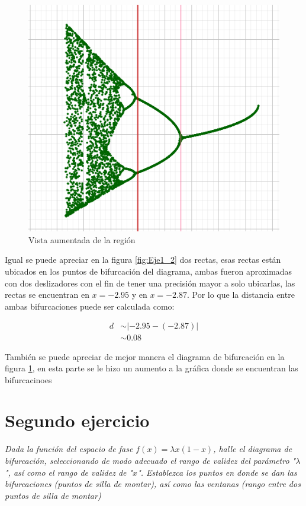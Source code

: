 \documentclass[11pt]{report}
\theoremstyle{plain}
\theoremstyle{definition}
\begin{document}
\begin{figure}[!h] %
	\centering
	\includegraphics[scale=0.3]{caos_1_3.png}
	\caption{Vista aumentada de la región}
	\label{fig:Eje1_3}
\end{figure}

Igual se puede apreciar en la figura \ref{fig:Eje1_2} dos rectas, esas rectas están ubicados en los puntos de bifurcación del diagrama, ambas fueron aproximadas con dos deslizadores con el fin de tener una precisión mayor a solo ubicarlas, las rectas se encuentran en $x=-2.95$ y en $x=-2.87$. Por lo que la distancia entre ambas bifurcaciones puede ser calculada como:

\begin{align*}
	d &\sim |-2.95-(-2.87)|\\
	&\sim 0.08
\end{align*}


También se puede apreciar de mejor manera el diagrama de bifurcación en la figura \ref{fig:Eje1_3}, en esta parte se le hizo un aumento a la gráfica donde se encuentran las bifurcacinoes


\section{Segundo ejercicio}
\textit{Dada la función del espacio de fase $f(x) = \lambda x(1-x)$, halle el diagrama de bifurcación, seleccionando de modo adecuado el rango de validez del parámetro "$\lambda$", así como el rango de validez de "$x$". Establezca los puntos en donde se dan las bifurcaciones (puntos de silla de montar), así como las ventanas (rango entre dos puntos de silla de montar)}
\end{document}
